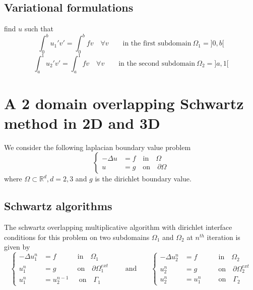 \subsection{Variational formulations}
\label{sec:vari-form-1}
find $u$ such that
\begin{equation*}
  \int_0^b u_1'v' = \int_0^b fv \quad \forall v \qquad \text{in the first subdomain} ~\Omega_1 = ]0,b[
\end{equation*}
\vspace{-5pt}
\begin{equation*}
  \int_a^1 u_2'v' = \int_a^1 fv \quad \forall v \qquad \text{in the second subdomain} ~ \Omega_2 = ]a,1[
\end{equation*}

\section{A 2 domain overlapping Schwartz method in 2D and 3D}
\label{sec:2-doma-overl}

We consider the following laplacian boundary value  problem
\begin{equation}
  \left \{
    \begin{aligned}
      -\Delta u & = f \quad \text{in} \quad  \Omega \\
      u & = g \quad \text{on} \quad  \partial\Omega
    \end{aligned}
  \right.
 \label{eq:33}
\end{equation}
where $\Omega \subset \mathbb R^d, d=2,3$ and $g$ is the dirichlet boundary value.

\subsection{Schwartz algorithms}
\label{sec:schwartz-algorithms-1}
The schwartz overlapping multiplicative algorithm with dirichlet interface conditions for this problem on two subdomains $\Omega_1$
and $\Omega_2$ at $n^{th}$ iteration is given by
\begin{equation}
  \label{eq:34}
  \left \{
    \begin{aligned}
      -\Delta u_1^n & =  f \quad \qquad  \text{in}  \quad  \Omega_1  \\
       u_1^n  & =  g \quad \qquad  \text{on} \quad \partial \Omega_1^{ext}\\
       u_1^n  & = u_2^{n-1} \quad ~~  \text{on} \quad \Gamma_1
    \end{aligned}
  \right.
\qquad \text{and} \qquad
  \left \{
    \begin{aligned}
      - \Delta u_2^n & =  f \quad \qquad  \text{in}  \quad  \Omega_2  \\
      u_2^n  & =  g  \quad \qquad  \text{on} \quad \partial \Omega_2^{ext}\\
      u_2^n  & = u_1^n \qquad~~  \text{on} \quad \Gamma_2
    \end{aligned}
  \right.
\end{equation}

